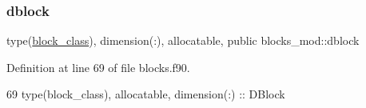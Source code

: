\subsubsection{\texorpdfstring{dblock}{dblock}}
{\footnotesize\ttfamily type(\mbox{\hyperlink{structblocks__mod_1_1block__class}{block\+\_\+class}}), dimension(\+:), allocatable, public blocks\+\_\+mod\+::dblock}



Definition at line 69 of file blocks.\+f90.


\begin{DoxyCode}
69     \textcolor{keywordtype}{type}(block\_class), \textcolor{keywordtype}{allocatable}, \textcolor{keywordtype}{dimension(:)} :: DBlock
\end{DoxyCode}
